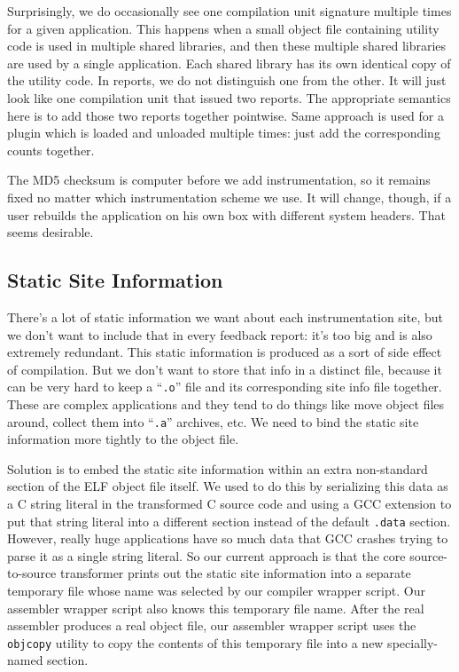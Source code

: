 \documentclass[10pt,twocolumn]{article}
\begin{document}
Surprisingly, we do occasionally see one compilation unit signature
multiple times for a given application.  This happens when a small
object file containing utility code is used in multiple shared
libraries, and then these multiple shared libraries are used by a
single application.  Each shared library has its own identical copy of
the utility code.  In reports, we do not distinguish one from the
other.  It will just look like one compilation unit that issued two
reports.  The appropriate semantics here is to add those two reports
together pointwise.  Same approach is used for a plugin which is
loaded and unloaded multiple times: just add the corresponding counts
together.

The MD5 checksum is computer before we add instrumentation, so it
remains fixed no matter which instrumentation scheme we use.  It will
change, though, if a user rebuilds the application on his own box with
different system headers.  That seems desirable.

\subsection{Static Site Information}

There's a lot of static information we want about each instrumentation
site, but we don't want to include that in every feedback report: it's
too big and is also extremely redundant.  This static information is
produced as a sort of side effect of compilation.  But we don't want
to store that info in a distinct file, because it can be very hard to
keep a ``\texttt{.o}'' file and its corresponding site info file
together.  These are complex applications and they tend to do things
like move object files around, collect them into ``\texttt{.a}''
archives, etc.  We need to bind the static site information more
tightly to the object file.

Solution is to embed the static site information within an extra
non-standard section of the ELF object file itself.  We used to do
this by serializing this data as a C string literal in the transformed
C source code and using a GCC extension to put that string literal
into a different section instead of the default \texttt{.data}
section.  However, really huge applications have so much data that GCC
crashes trying to parse it as a single string literal.  So our current
approach is that the core source-to-source transformer prints out the
static site information into a separate temporary file whose name was
selected by our compiler wrapper script.  Our assembler wrapper script
also knows this temporary file name.  After the real assembler
produces a real object file, our assembler wrapper script uses the
\texttt{objcopy} utility to copy the contents of this temporary file
into a new specially-named section.
\end{document}
